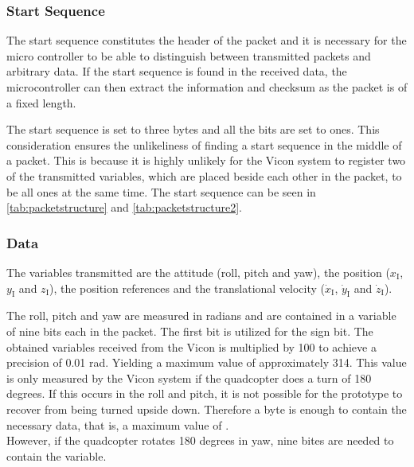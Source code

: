 \subsubsection{Start Sequence}
The start sequence constitutes the header of the packet and it is necessary for the micro controller to be able to distinguish between transmitted packets and arbitrary data. %
If the start sequence is found in the received data, the microcontroller can then extract the information and checksum as the packet is of a fixed length. 

The start sequence is set to three bytes and all the bits are set to ones. This consideration ensures the unlikeliness of finding a start sequence in the middle of a packet. This is because it is highly unlikely for the Vicon system to register two of the transmitted variables, which are placed beside each other in the packet, to be all ones at the same time. The start sequence can be seen in \autoref{tab:packetstructure} and \autoref{tab:packetstructure2}.

\subsubsection{Data}
The variables transmitted are the attitude (roll, pitch and yaw), the position ($x_{\mathrm{I}}$, $y_{\mathrm{I}}$ and $z_{\mathrm{I}}$), the position references and the translational velocity ($\dot{x}_{\mathrm{I}}$, $\dot{y}_{\mathrm{I}}$ and $\dot{z}_{\mathrm{I}}$).

The roll, pitch and yaw are measured in radians and are contained in a variable of nine bits each in the packet. The first bit is utilized for the sign bit. The obtained variables received from the Vicon is multiplied by 100 to achieve a precision of 0.01 rad. Yielding a maximum value of approximately 314. This value is only measured by the Vicon system if the quadcopter does a turn of 180 degrees. If this occurs in the roll and pitch, it is not possible for the prototype to recover from being turned upside down. Therefore a byte is enough to contain the necessary data, that is, a maximum value of . \\ However, if the quadcopter rotates 180 degrees in yaw, nine bites are needed to contain the variable.

